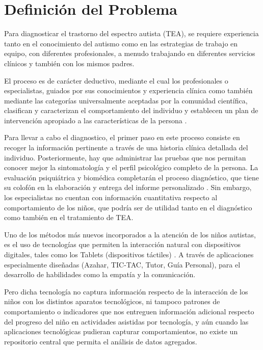 \documentclass[12pt,letterpaper]{article}
\begin{document}
\section{Definici\'on del Problema}
\label{def}


Para diagnosticar el trastorno del espectro autista (TEA), se 
requiere experiencia tanto en el conocimiento del autismo como 
en las estrategias de trabajo en equipo, con diferentes profesionales, 
a menudo trabajando en diferentes servicios cl\'inicos y tambi\'en 
con los mismos padres.

El proceso es de car\'acter deductivo, mediante el cual los profesionales 
o especialistas, guiados por sus conocimientos y experiencia cl\'inica 
como tambi\'en mediante las categor\'ias universalmente aceptadas por 
la comunidad cient\'ifica, clasifican y caracterizan el comportamiento 
del individuo y establecen un plan de intervenci\'on apropiado a las 
caracter\'isticas de la persona \cite{REF4}.

Para llevar a cabo el diagnostico, el primer paso en este proceso 
consiste en recoger la informaci\'on pertinente a trav\'es de una historia 
cl\'inica detallada del individuo. Posteriormente, hay que administrar 
las pruebas que nos permitan conocer mejor la sintomatolog\'ia y el 
perfil psicol\'ogico completo de la persona. La evaluaci\'on psiqui\'atrica 
y biom\'edica completar\'an el proceso diagn\'ostico, que tiene su colof\'on 
en la elaboraci\'on y entrega del informe personalizado \cite{REF4}. Sin embargo, 
los especialistas no cuentan con informaci\'on cuantitativa respecto al 
comportamiento de los ni\~nos, que podr\'ia ser de utilidad tanto en el 
diagn\'ostico como tambi\'en en el tratamiento de TEA.

Uno de los m\'etodos m\'as nuevos incorporados a la atenci\'on de los ni\~nos autistas, 
es el uso de tecnolog\'ias que permiten la interacci\'on natural con dispositivos 
digitales, tales como los Tablets (dispositivos t\'actiles) \cite{REF5}. A trav\'es de 
aplicaciones especialmente dise\~nadas (Azahar, TIC-TAC, Tutor, Gu\'ia Personal),  
para el desarrollo de habilidades como la empat\'ia y la comunicaci\'on.

Pero dicha tecnolog\'ia no captura informaci\'on respecto de la interacci\'on 
de los ni\~nos con los distintos aparatos tecnol\'ogicos, ni tampoco patrones 
de comportamiento o indicadores que nos entreguen informaci\'on adicional 
respecto del progreso del ni\~no en actividades asistidas por tecnolog\'ia, 
y a\'un cuando las aplicaciones tecnol\'ogicas pudieran capturar comportamientos, 
no existe un repositorio central que permita el an\'alisis de datos agregados.
\end{document}
